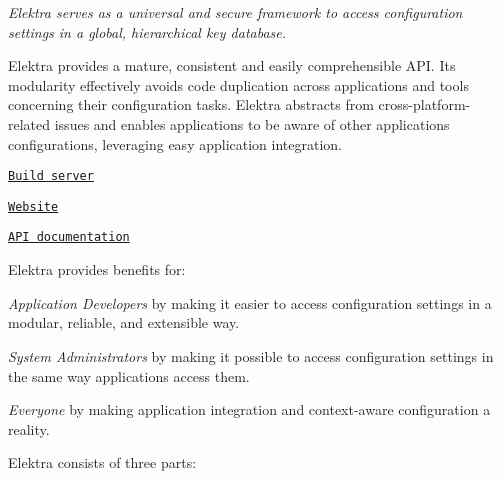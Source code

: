 \href{https://github.com/ElektraInitiative/libelektra/releases/latest}{\tt } \href{https://build.libelektra.org/job/libelektra/job/master/lastBuild}{\tt } \href{https://travis-ci.org/ElektraInitiative/libelektra}{\tt } \href{https://cirrus-ci.com/github/ElektraInitiative/libelektra}{\tt } \href{https://coveralls.io/github/ElektraInitiative/libelektra}{\tt } \href{https://lgtm.com/projects/g/ElektraInitiative/libelektra/alerts}{\tt }

{\itshape Elektra serves as a universal and secure framework to access configuration settings in a global, hierarchical key database.}



Elektra provides a mature, consistent and easily comprehensible A\+PI. Its modularity effectively avoids code duplication across applications and tools concerning their configuration tasks. Elektra abstracts from cross-\/platform-\/related issues and enables applications to be aware of other applications\textquotesingle{} configurations, leveraging easy application integration.


\begin{DoxyItemize}
\item \href{https://build.libelektra.org/}{\tt Build server}
\item \href{https://www.libelektra.org}{\tt Website}
\item \href{https://doc.libelektra.org/api/latest/html/}{\tt A\+PI documentation}
\end{DoxyItemize}

Elektra provides benefits for\+:


\begin{DoxyEnumerate}
\item {\itshape Application Developers} by making it easier to access configuration settings in a modular, reliable, and extensible way.
\item {\itshape System Administrators} by making it possible to access configuration settings in the same way applications access them.
\item {\itshape Everyone} by making application integration and context-\/aware configuration a reality.
\end{DoxyEnumerate}

Elektra consists of three parts\+:


